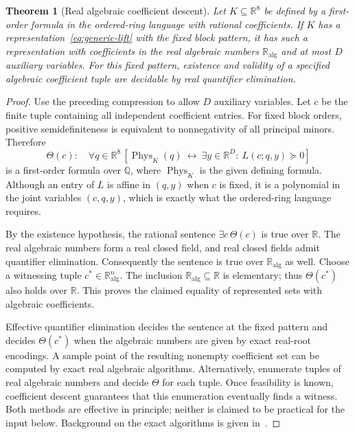 \documentclass[11pt]{article}
\newcommand{\R}{\mathbb R}
\newcommand{\RA}{\mathbb R_{\mathrm{alg}}}
\newcommand{\Phys}{\operatorname{Phys}}
\newtheorem{theorem}{Theorem}
\begin{document}
\begin{theorem}[Real algebraic coefficient descent]\label{thm:descent}
Let $K\subseteq\R^8$ be defined by a first-order formula in the ordered-ring language with rational coefficients. If $K$ has a representation~\eqref{eq:generic-lift} with the fixed block pattern, it has such a representation with coefficients in the real algebraic numbers $\RA$ and at most $D$ auxiliary variables. For this fixed pattern, existence and validity of a specified algebraic coefficient tuple are decidable by real quantifier elimination.
\end{theorem}
\begin{proof}
Use the preceding compression to allow $D$ auxiliary variables. Let $c$ be the finite tuple containing all independent coefficient entries. For fixed block orders, positive semidefiniteness is equivalent to nonnegativity of all principal minors. Therefore
\begin{equation}\label{eq:theta}
 \Theta(c):\quad\forall q\in\R^8\,
 \left[\Phys_K(q)\ \longleftrightarrow\
       \exists y\in\R^D:\ L(c;q,y)\succeq0\right]
\end{equation}
is a first-order formula over $\mathbb Q$, where $\Phys_K$ is the given defining formula. Although an entry of $L$ is affine in $(q,y)$ when $c$ is fixed, it is a polynomial in the joint variables $(c,q,y)$, which is exactly what the ordered-ring language requires.

By the existence hypothesis, the rational sentence $\exists c\,\Theta(c)$ is true over $\R$. The real algebraic numbers form a real closed field, and real closed fields admit quantifier elimination. Consequently the sentence is true over $\RA$ as well. Choose a witnessing tuple $c^*\in\RA^n$. The inclusion $\RA\subseteq\R$ is elementary; thus $\Theta(c^*)$ also holds over $\R$. This proves the claimed equality of represented sets with algebraic coefficients.

Effective quantifier elimination decides the sentence at the fixed pattern and decides $\Theta(c^*)$ when the algebraic numbers are given by exact real-root encodings. A sample point of the resulting nonempty coefficient set can be computed by exact real algebraic algorithms. Alternatively, enumerate tuples of real algebraic numbers and decide $\Theta$ for each tuple. Once feasibility is known, coefficient descent guarantees that this enumeration eventually finds a witness. Both methods are effective in principle; neither is claimed to be practical for the input below. Background on the exact algorithms is given in~\cite{Basu}.
\end{proof}
\end{document}
